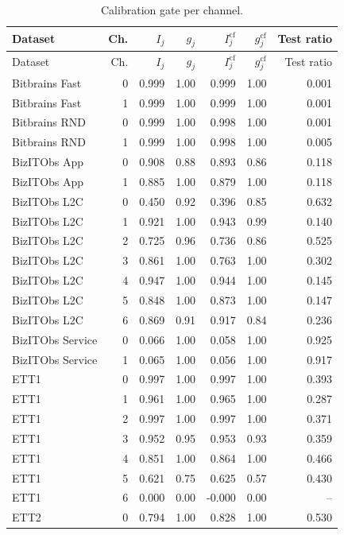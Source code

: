 \begin{longtable}{lrrrrrr}
\caption{Calibration gate per channel.}\label{tab:s-gate}\\
\toprule
Dataset & Ch. & $I_j$ & $g_j$ & $I_j^{\mathrm{cf}}$ & $g_j^{\mathrm{cf}}$ & Test ratio \\
\midrule
\endfirsthead
\toprule
Dataset & Ch. & $I_j$ & $g_j$ & $I_j^{\mathrm{cf}}$ & $g_j^{\mathrm{cf}}$ & Test ratio \\
\midrule
\endhead
Bitbrains Fast & 0 & 0.999 & 1.00 & 0.999 & 1.00 & 0.001 \\
Bitbrains Fast & 1 & 0.999 & 1.00 & 0.999 & 1.00 & 0.001 \\
Bitbrains RND & 0 & 0.999 & 1.00 & 0.998 & 1.00 & 0.001 \\
Bitbrains RND & 1 & 0.999 & 1.00 & 0.998 & 1.00 & 0.005 \\
BizITObs App & 0 & 0.908 & 0.88 & 0.893 & 0.86 & 0.118 \\
BizITObs App & 1 & 0.885 & 1.00 & 0.879 & 1.00 & 0.118 \\
BizITObs L2C & 0 & 0.450 & 0.92 & 0.396 & 0.85 & 0.632 \\
BizITObs L2C & 1 & 0.921 & 1.00 & 0.943 & 0.99 & 0.140 \\
BizITObs L2C & 2 & 0.725 & 0.96 & 0.736 & 0.86 & 0.525 \\
BizITObs L2C & 3 & 0.861 & 1.00 & 0.763 & 1.00 & 0.302 \\
BizITObs L2C & 4 & 0.947 & 1.00 & 0.944 & 1.00 & 0.145 \\
BizITObs L2C & 5 & 0.848 & 1.00 & 0.873 & 1.00 & 0.147 \\
BizITObs L2C & 6 & 0.869 & 0.91 & 0.917 & 0.84 & 0.236 \\
BizITObs Service & 0 & 0.066 & 1.00 & 0.058 & 1.00 & 0.925 \\
BizITObs Service & 1 & 0.065 & 1.00 & 0.056 & 1.00 & 0.917 \\
ETT1 & 0 & 0.997 & 1.00 & 0.997 & 1.00 & 0.393 \\
ETT1 & 1 & 0.961 & 1.00 & 0.965 & 1.00 & 0.287 \\
ETT1 & 2 & 0.997 & 1.00 & 0.997 & 1.00 & 0.371 \\
ETT1 & 3 & 0.952 & 0.95 & 0.953 & 0.93 & 0.359 \\
ETT1 & 4 & 0.851 & 1.00 & 0.864 & 1.00 & 0.466 \\
ETT1 & 5 & 0.621 & 0.75 & 0.625 & 0.57 & 0.430 \\
ETT1 & 6 & 0.000 & 0.00 & -0.000 & 0.00 & -- \\
ETT2 & 0 & 0.794 & 1.00 & 0.828 & 1.00 & 0.530 \\

\end{longtable}
